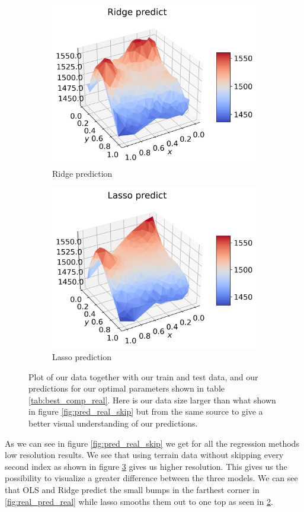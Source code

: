 \documentclass[12pt]{article}
\begin{document}
\begin{figure}[H]
\begin{subfigure}{.5\textwidth}
    \centering
    \includegraphics[width=\textwidth]{../figures/ridge_pred_n40.png}
    \caption{Ridge prediction}
    \label{fig:real_pred_ridge}
  \end{subfigure}
  \begin{subfigure}{.5\textwidth}
    \centering
    \includegraphics[width=\textwidth]{../figures/lasso_pred_n40.png}
    \caption{Lasso prediction}
    \label{fig:real_pred_lasso}
  \end{subfigure}
  \caption{Plot of our data together with our train and test data, and our predictions for our optimal parameters shown in table \ref{tab:best_comp_real}. Here is our data size larger than what shown in figure \ref{fig:pred_real_skip} but from the same source to give a better visual understanding of our predictions.}
  \label{fig:real_pred}
\end{figure}
As we can see in figure \ref{fig:pred_real_skip} we get for all the regression methods low resolution results. We see that using terrain data without skipping every second index as shown in figure \ref{fig:real_pred} gives us higher resolution. This gives us the possibility to visualize a greater difference between the three models. We can see that OLS and Ridge predict the small bumps in the farthest corner in \ref{fig:real_pred_real} while lasso smooths them out to one top as seen in \ref{fig:real_pred_lasso}.
\end{document}
